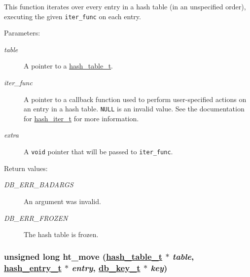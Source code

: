 This function iterates over every entry in a hash table (in an unspecified order), executing the given {\tt iter\_\-func} on each entry.\begin{Desc}
\item[Parameters: ]\par
\begin{description}
\item[{\em 
table}]A pointer to a \hyperlink{group__dbprim__hash_a0}{hash\_\-table\_\-t}. \item[{\em 
iter\_\-func}]A pointer to a callback function used to perform user-specified actions on an entry in a hash table. {\tt NULL} is an invalid value. See the documentation for \hyperlink{group__dbprim__hash_a2}{hash\_\-iter\_\-t} for more information. \item[{\em 
extra}]A {\tt void} pointer that will be passed to {\tt iter\_\-func}.\end{description}
\end{Desc}
\begin{Desc}
\item[Return values: ]\par
\begin{description}
\item[{\em 
DB\_\-ERR\_\-BADARGS}]An argument was invalid. \item[{\em 
DB\_\-ERR\_\-FROZEN}]The hash table is frozen. \end{description}
\end{Desc}
\hypertarget{group__dbprim__hash_a8}{
\subsubsection[ht\_\-move]{\setlength{\rightskip}{0pt plus 5cm}unsigned long ht\_\-move (\hyperlink{group__dbprim__hash_a0}{hash\_\-table\_\-t} $\ast$ {\em table}, \hyperlink{group__dbprim__hash_a1}{hash\_\-entry\_\-t} $\ast$ {\em entry}, \hyperlink{group__dbprim_a0}{db\_\-key\_\-t} $\ast$ {\em key})}}
\label{group__dbprim__hash_a8}



